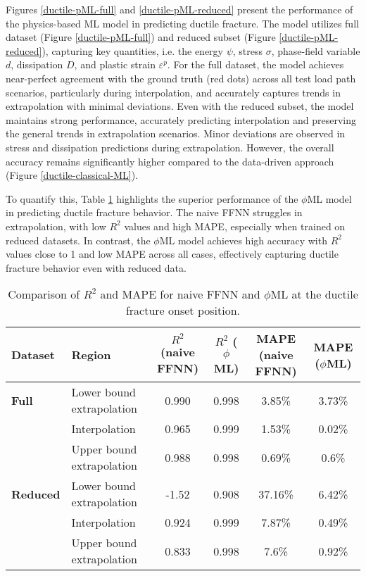 \documentclass[final,3p,times]{elsarticle}
\begin{document}
Figures \ref{ductile-pML-full} and \ref{ductile-pML-reduced} present the performance of the physics-based ML model in predicting ductile fracture. The model utilizes full dataset (Figure \ref{ductile-pML-full}) and reduced subset (Figure \ref{ductile-pML-reduced}), capturing key quantities, i.e. the energy $\psi$, stress $\sigma$, phase-field variable $d$, dissipation $D$, and plastic strain $\varepsilon^p$. For the full dataset, the model achieves near-perfect agreement with the ground truth (red dots) across all test load path scenarios, particularly during interpolation, and accurately captures trends in extrapolation with minimal deviations. Even with the reduced subset, the model maintains strong performance, accurately predicting interpolation and preserving the general trends in extrapolation scenarios. Minor deviations are observed in stress and dissipation predictions during extrapolation. However, the overall accuracy remains significantly higher compared to the data-driven approach (Figure \ref{ductile-classical-ML}).

To quantify this, Table \ref{tab:comparison-duc} highlights the superior performance of the $\phi$ML model in predicting ductile fracture behavior.  The naive FFNN struggles in extrapolation, with low $R^2$ values and high MAPE, especially when trained on reduced datasets. In contrast, the $\phi$ML model achieves high accuracy with $R^2$ values close to 1 and low MAPE across all cases, effectively capturing ductile fracture behavior even with reduced data.


\begin{table}[h]
    \centering
    \renewcommand{\arraystretch}{1.2}
    \begin{tabular}{l l c c c c}
        \toprule
        \textbf{Dataset} & \textbf{Region} & $R^2$ (naive FFNN) & $R^2$ ($\phi$ML) & MAPE (naive FFNN) & MAPE ($\phi$ML) \\
        \midrule
        \textbf{Full} & Lower bound extrapolation & 0.990 & 0.998 & 3.85\% & 3.73\% \\
        & Interpolation & 0.965 & 0.999 & 1.53\% & 0.02\% \\
        & Upper bound extrapolation & 0.988 & 0.998 & 0.69\% & 0.6\% \\
        \midrule
        \textbf{Reduced} & Lower bound extrapolation & -1.52 & 0.908 & 37.16\% & 6.42\% \\
        & Interpolation & 0.924 & 0.999 & 7.87\% & 0.49\% \\
        & Upper bound extrapolation & 0.833 & 0.998 & 7.6\% & 0.92\% \\
        \bottomrule
    \end{tabular}
    \caption{Comparison of $R^2$ and MAPE for naive FFNN and $\phi$ML at the ductile fracture onset position.}
    \label{tab:comparison-duc}
\end{table}
\end{document}
